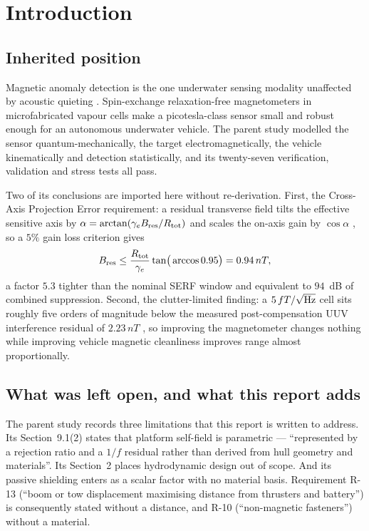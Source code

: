 \documentclass[11pt]{article}
\newcommand{\nT}{\,nT}\newcommand{\pT}{\,pT}\newcommand{\fT}{\,fT}
\begin{document}
\section{Introduction}
\subsection{Inherited position}
Magnetic anomaly detection is the one underwater sensing modality unaffected by
acoustic quieting \cite{srreport}. Spin-exchange relaxation-free magnetometers
\cite{allred2002} in microfabricated vapour cells \cite{griffith2010} make a
picotesla-class sensor small and robust enough for an autonomous underwater
vehicle. The parent study modelled the sensor quantum-mechanically, the target
electromagnetically, the vehicle kinematically and detection statistically, and
its twenty-seven verification, validation and stress tests all pass.

Two of its conclusions are imported here without re-derivation. First, the
Cross-Axis Projection Error requirement: a residual transverse field tilts the
effective sensitive axis by $\alpha=\arctan(\gamma_e B_{\rm res}/R_{\rm tot})$
and scales the on-axis gain by $\cos\alpha$ \cite{borna2022}, so a $5\%$ gain
loss criterion gives
\begin{equation}
B_{\rm res}\leq\frac{R_{\rm tot}}{\gamma_e}\tan\!\big(\arccos 0.95\big)=0.94\nT ,
\label{eq:req}
\end{equation}
a factor $5.3$ tighter than the nominal SERF window and equivalent to $94$~dB of
combined suppression. Second, the clutter-limited finding: a $5\fT/\sqrt{\rm Hz}$
cell \cite{griffith2010} sits roughly five orders of magnitude below the
measured post-compensation UUV interference residual of $2.23\nT$
\cite{oehler2024}, so improving the magnetometer changes nothing while improving
vehicle magnetic cleanliness improves range almost proportionally.

\subsection{What was left open, and what this report adds}
The parent study records three limitations that this report is written to
address. Its Section~9.1(2) states that platform self-field is parametric ---
``represented by a rejection ratio and a $1/f$ residual rather than derived from
hull geometry and materials''. Its Section~2 places hydrodynamic design out of
scope. And its passive shielding enters as a scalar factor with no material
basis. Requirement R-13 (``boom or tow displacement maximising distance from
thrusters and battery'') is consequently stated without a distance, and R-10
(``non-magnetic fasteners'') without a material.
\end{document}
